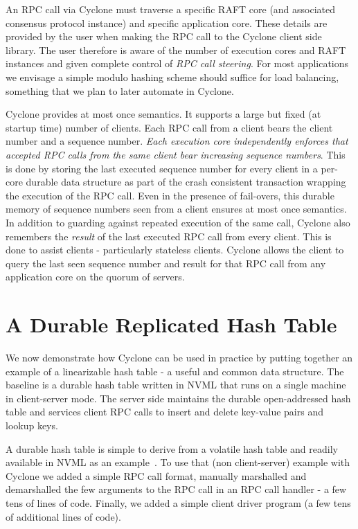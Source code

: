 \documentclass[10pt, preprint]{sigplanconf}
\begin{document}
An RPC call via Cyclone must traverse a specific RAFT core (and associated
consensus protocol instance) and specific application core. These details are
provided by the user when making the RPC call to the Cyclone client side
library. The user therefore is aware of the number of execution cores and RAFT
instances and given complete control of \emph{RPC call steering}. For most
applications we envisage a simple modulo hashing scheme should suffice for load
balancing, something that we plan to later automate in Cyclone.

Cyclone provides at most once semantics. It supports a large but fixed (at
startup time) number of clients. Each RPC call from a client bears the client
number and a sequence number. \emph{Each execution core independently enforces
  that accepted RPC calls from the same client bear increasing sequence
  numbers}. This is done by storing the last executed sequence number for every
client in a per-core durable data structure as part of the crash consistent
transaction wrapping the execution of the RPC call. Even in the presence of
fail-overs, this durable memory of sequence numbers seen from a client ensures
at most once semantics. In addition to guarding against repeated execution of
the same call, Cyclone also remembers the \emph{result} of the last executed RPC
call from every client. This is done to assist clients - particularly stateless
clients. Cyclone allows the client to query the last seen sequence number and
result for that RPC call from any application core on the quorum of servers.

\section{A Durable Replicated Hash Table}
\label{sec:example}
We now demonstrate how Cyclone can be used in practice by putting together an
example of a linearizable hash table - a useful and common data structure.
The baseline is a durable hash table written in NVML that runs on a
single machine in client-server mode. The server side maintains the durable
open-addressed hash table and services client RPC calls to insert and delete
key-value pairs and lookup keys.

A durable hash table is simple to derive from a volatile hash table and readily
available in NVML as an example~\cite{nvml_hash}. To use that (non
client-server) example with Cyclone we added a simple RPC call format, manually
marshalled and demarshalled the few arguments to the RPC call in an RPC call
handler - a few tens of lines of code. Finally, we added a simple client driver
program (a few tens of additional lines of code).
\end{document}
